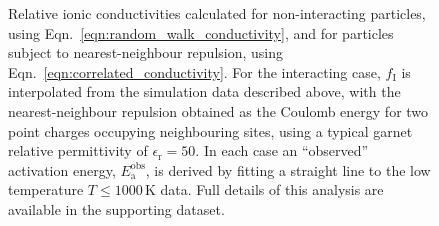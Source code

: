 \documentclass[aps,prb,twocolumn,superscriptaddress,reprint]{revtex4-1}
\renewcommand{\u}[1]{\,\mathrm{#1}}
\newcommand{\m}[1]{\mathrm{#1}}
\begin{document}
\begin{figure}[tb]
  \centering
    \caption{\label{fig:arrhenius_example}Relative ionic conductivities calculated for non-interacting particles, using Eqn.~\ref{eqn:random_walk_conductivity}, and for particles subject to nearest-neighbour repulsion, using Eqn.~\ref{eqn:correlated_conductivity}. For the interacting case, $f_\m{I}$ is interpolated from the simulation data described above, with the nearest-neighbour repulsion obtained as the Coulomb energy for two point charges occupying neighbouring sites, using a typical garnet relative permittivity of $\epsilon_\mathrm{r}=50$.\cite{RettenwanderEtAl_InorgChem2015} In each case an ``observed'' activation energy, $E_\m{a}^\m{obs}$, is derived by fitting a straight line to the low temperature $T\leq1000\u{K}$ data. Full details of this analysis are available in the supporting dataset.\cite{morgan_benjamin_j_2017_821864}}
\end{figure}
\end{document}
